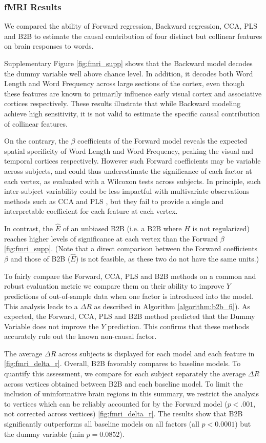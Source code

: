 \subsubsection{fMRI Results}
We compared the ability of Forward regression, Backward regression, CCA, PLS
and B2B to estimate the causal contribution of four distinct but collinear
features on brain responses to words.

Supplementary Figure \ref{fig:fmri_supp} shows that the Backward model decodes
the dummy variable well above chance level. In addition, it decodes both Word
Length and Word Frequency across large sections of the cortex, even though
these features are known to primarily influence early visual cortex and
associative cortices respectively. These results illustrate that while Backward
modeling achieve high sensitivity, it is not valid to estimate the specific
causal contribution of collinear features.

On the contrary, the $\beta$
coefficients of the Forward model reveals the expected spatial specificity of
Word Length and Word Frequency, peaking the visual and temporal cortices
respectively. However such Forward coefficients may be variable across
subjects, and could thus underestimate the significance of each factor at each
vertex, as evaluated with a Wilcoxon tests across subjects. In principle, such
inter-subject variability could be less impactful with
multivariate observations methods such as CCA and PLS \citep{bilenko2016pyrcca,
king2018encoding}, but they fail to provide a single and interpretable coefficient
for each feature at each vertex.

In contrast, the $\hat E$ of an unbiased B2B (i.e. a B2B where $H$ is not
regularized) reaches higher levels of significance at each vertex
than the Forward $\beta$ \ref{fig:fmri_supp}. (Note that a direct
comparison between the Forward coefficients $\beta$ and those of B2B ($\hat E$)
is not feasible, as these two do not have the same units.)

To fairly compare the Forward, CCA, PLS and B2B methods on a common and robust
evaluation metric we compare them on their ability to improve $Y$
predictions of out-of-sample data when one factor is introduced into the model.
This analysis leads to a $\Delta R$ as described in Algorithm
\ref{algorithm:b2b_fi}). As expected, the Forward, CCA, PLS
and B2B method predicted that the Dummy Variable does not improve the $Y$
prediction. This confirms that these methods accurately rule out the known
non-causal factor.

The average $\Delta R$ across subjects is displayed for each model and each
feature in \ref{fig:fmri_delta_r}. Overall, B2B favorably compares to baseline models.
To quantify this assessment, we compare for each subject separately
the average $\Delta R$ across vertices obtained between B2B and each
baseline model. To limit the inclusion of uninformative brain regions in this
summary, we restrict the analysis to vertices which can be reliably accounted
for by the Forward model ($p<.001$, not corrected across vertices)
\ref{fig:fmri_delta_r}. The results show that B2B significantly outperforms all
baseline models on all factors (all $p<0.0001$) but the dummy variable
(min $p=0.0852$).
